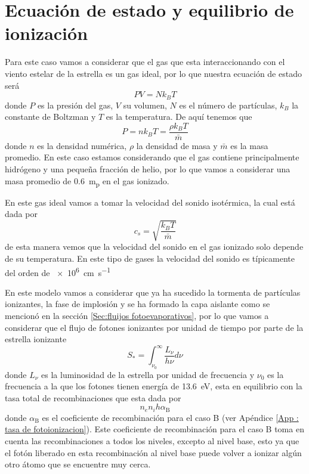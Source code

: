 \documentclass{book}
\begin{document}

\section{Ecuación de estado y equilibrio de ionización}

Para este caso vamos a considerar que el gas que esta interaccionando con el viento estelar de la estrella es un gas ideal, por lo que nuestra ecuación de estado será
\begin{equation}
    PV = Nk_BT
\end{equation} 
donde $P$ es la presión del gas, $V$ su volumen, $N$ es el número de partículas, $k_B$ la constante de Boltzman y $T$ es la temperatura. De aquí tenemos que \begin{equation}
    P = nk_BT = \frac{\rho k_B T}{\bar{m}}
\end{equation}
donde $n$ es la densidad numérica, $\rho$ la densidad de masa y $\bar{m}$ es la masa promedio. En este caso estamos considerando que el gas contiene principalmente hidrógeno y una pequeña fracción de helio, por lo que vamos a considerar una masa promedio de \SI{0.6}{m_{p}} en el gas ionizado.

En este gas ideal vamos a tomar la velocidad del sonido isotérmica, la cual está dada por
\begin{equation}
    c_s  = \sqrt{\frac{k_B T}{\bar{m}}}
\end{equation} 
de esta manera vemos que la velocidad del sonido en el gas ionizado solo depende de su temperatura. En este tipo de gases la velocidad del sonido es típicamente del orden de \SI{e6}{cm.s^{-1}}

En este modelo vamos a considerar que  ya ha sucedido la tormenta de partículas ionizantes, la fase de implosión y se ha formado la capa aislante como se mencionó en la sección \ref{Sec:fluijos fotoevaporativos}, por lo que vamos a considerar que el flujo de fotones ionizantes por unidad de tiempo por parte de la estrella ionizante 
\begin{equation}
    S_* = \int_{\nu_0}^\infty \frac{L_\nu}{h\nu}d\nu
\end{equation} 
donde $L_\nu$ es la luminosidad de la estrella por unidad de frecuencia y $\nu_0$ es la frecuencia a la que los fotones tienen energía de \SI{13.6}{eV}, esta en equilibrio con la tasa total de recombinaciones que esta dada por 
\[n_e n_i h \alpha_\mathrm{B}\] 
donde $\alpha_\mathrm{B}$ es el coeficiente de recombinación para el caso B (ver Apéndice \ref{App : tasa de fotoionizacion}). Este coeficiente de recombinación para el caso B toma en cuenta las recombinaciones a todos los niveles, excepto al nivel base, esto ya que el fotón liberado en esta recombinación al nivel base puede volver a ionizar algún otro átomo que se encuentre muy cerca. 
\end{document}

